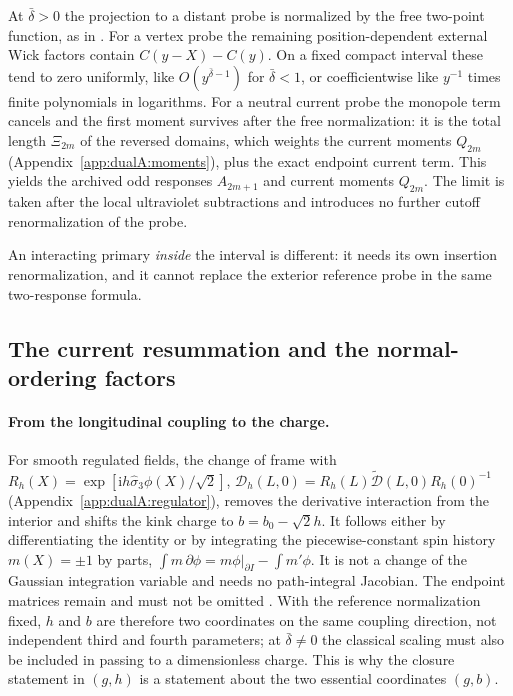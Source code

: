 \documentclass[11pt,a4paper]{article}
\numberwithin{equation}{section}
\newcommand{\db}{\bar\delta}
\begin{document}
At $\db>0$ the projection to a distant probe is normalized by the free two-point function, as in
\cite[Eq.~(4.18)]{Benedetti:2025nzp}. For a vertex probe the remaining position-dependent external Wick factors contain
$C(y-X)-C(y)$. On a fixed compact interval these tend to zero uniformly, like $O(y^{\db-1})$ for $\db<1$, or
coefficientwise like $y^{-1}$ times finite polynomials in logarithms. For a neutral current probe the monopole term
cancels and the first moment survives after the free normalization: it is the total length $\Xi_{2m}$ of the reversed domains, which
weights the current moments $Q_{2m}$ (Appendix~\ref{app:dualA:moments}), plus the exact endpoint current term. This yields the
archived odd responses $A_{2m+1}$ and current moments $Q_{2m}$. The limit is taken after the local ultraviolet
subtractions and introduces no further cutoff renormalization of the probe.

An interacting primary \emph{inside} the interval is different: it needs its own insertion renormalization, and it
cannot replace the exterior reference probe in the same two-response formula.

\subsection{The current resummation and the normal-ordering factors}\label{app:clos:current}
\paragraph{From the longitudinal coupling to the charge.} For smooth regulated fields, the change of frame with
$R_h(X)=\exp[\mathrm ih\hat\sigma_3\phi(X)/\sqrt2]$, $\mathcal D_h(L,0)=R_h(L)\widetilde{\mathcal D}(L,0)R_h(0)^{-1}$
(Appendix~\ref{app:dualA:regulator}), removes the derivative interaction from the interior and shifts the kink charge
to $b=b_0-\sqrt2h$. It follows either by differentiating the identity or by integrating the piecewise-constant spin
history $m(X)=\pm1$ by parts, $\int m\,\partial\phi=m\phi|_{\partial I}-\int m'\phi$. It is not a change of the
Gaussian integration variable and needs no path-integral Jacobian. The endpoint matrices remain and must not be
omitted \cite[Sec.~3.2.1]{Benedetti:2025nzp}. With the reference normalization fixed, $h$ and $b$ are therefore two
coordinates on the same coupling direction, not independent third and fourth parameters; at $\db\ne0$ the classical
scaling must also be included in passing to a dimensionless charge. This is why the closure statement in $(g,h)$ is a
statement about the two essential coordinates $(g,b)$.
\end{document}
